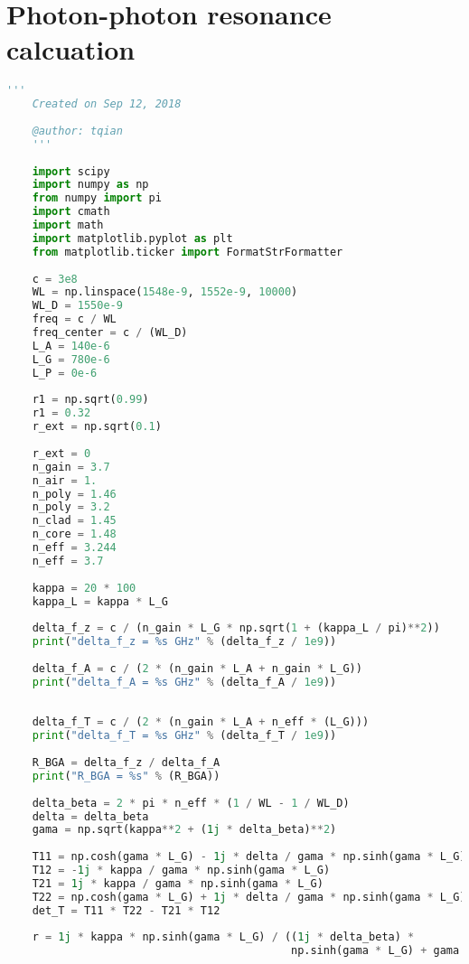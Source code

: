 \section{Photon-photon resonance calcuation}\label{sec:PP_resonance_cal}

\begin{lstlisting}[language=Python, basicstyle=\tiny]
    '''
    Created on Sep 12, 2018
    
    @author: tqian
    '''
    
    import scipy
    import numpy as np
    from numpy import pi
    import cmath
    import math
    import matplotlib.pyplot as plt
    from matplotlib.ticker import FormatStrFormatter
    
    c = 3e8
    WL = np.linspace(1548e-9, 1552e-9, 10000)
    WL_D = 1550e-9
    freq = c / WL
    freq_center = c / (WL_D)
    L_A = 140e-6
    L_G = 780e-6
    L_P = 0e-6
    
    r1 = np.sqrt(0.99)
    r1 = 0.32
    r_ext = np.sqrt(0.1)
    
    r_ext = 0
    n_gain = 3.7
    n_air = 1.
    n_poly = 1.46
    n_poly = 3.2
    n_clad = 1.45
    n_core = 1.48
    n_eff = 3.244
    n_eff = 3.7
    
    kappa = 20 * 100
    kappa_L = kappa * L_G
    
    delta_f_z = c / (n_gain * L_G * np.sqrt(1 + (kappa_L / pi)**2))
    print("delta_f_z = %s GHz" % (delta_f_z / 1e9))
    
    delta_f_A = c / (2 * (n_gain * L_A + n_gain * L_G))
    print("delta_f_A = %s GHz" % (delta_f_A / 1e9))
    
    
    delta_f_T = c / (2 * (n_gain * L_A + n_eff * (L_G)))
    print("delta_f_T = %s GHz" % (delta_f_T / 1e9))
    
    R_BGA = delta_f_z / delta_f_A
    print("R_BGA = %s" % (R_BGA))
    
    delta_beta = 2 * pi * n_eff * (1 / WL - 1 / WL_D)
    delta = delta_beta
    gama = np.sqrt(kappa**2 + (1j * delta_beta)**2)
    
    T11 = np.cosh(gama * L_G) - 1j * delta / gama * np.sinh(gama * L_G)
    T12 = -1j * kappa / gama * np.sinh(gama * L_G)
    T21 = 1j * kappa / gama * np.sinh(gama * L_G)
    T22 = np.cosh(gama * L_G) + 1j * delta / gama * np.sinh(gama * L_G)
    det_T = T11 * T22 - T21 * T12
    
    r = 1j * kappa * np.sinh(gama * L_G) / ((1j * delta_beta) *
                                            np.sinh(gama * L_G) + gama * np.cosh(gama * L_G))
    

\end{lstlisting}
